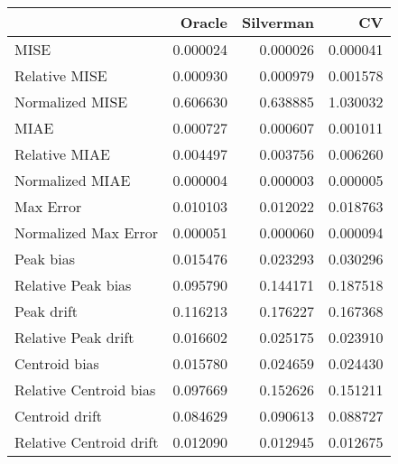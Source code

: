\begin{tabular}{lrrr}
  \hline
 & Oracle & Silverman & CV \\ 
  \hline
MISE & 0.000024 & 0.000026 & 0.000041 \\ 
  Relative MISE & 0.000930 & 0.000979 & 0.001578 \\ 
  Normalized MISE & 0.606630 & 0.638885 & 1.030032 \\ 
  MIAE & 0.000727 & 0.000607 & 0.001011 \\ 
  Relative MIAE & 0.004497 & 0.003756 & 0.006260 \\ 
  Normalized MIAE & 0.000004 & 0.000003 & 0.000005 \\ 
  Max Error & 0.010103 & 0.012022 & 0.018763 \\ 
  Normalized Max Error & 0.000051 & 0.000060 & 0.000094 \\ 
  Peak bias & 0.015476 & 0.023293 & 0.030296 \\ 
  Relative Peak bias & 0.095790 & 0.144171 & 0.187518 \\ 
  Peak drift & 0.116213 & 0.176227 & 0.167368 \\ 
  Relative Peak drift & 0.016602 & 0.025175 & 0.023910 \\ 
  Centroid bias & 0.015780 & 0.024659 & 0.024430 \\ 
  Relative Centroid bias & 0.097669 & 0.152626 & 0.151211 \\ 
  Centroid drift & 0.084629 & 0.090613 & 0.088727 \\ 
  Relative Centroid drift & 0.012090 & 0.012945 & 0.012675 \\ 
   \hline
\end{tabular}

